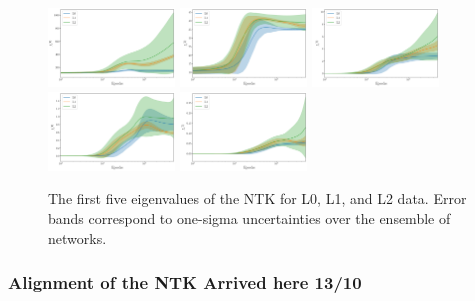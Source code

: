 \begin{figure}[t]
  \centering
  \includegraphics[width=0.30\textwidth]{figs/section_3/ntk_eigvals_L0_L1_L2_n_1.pdf}
  \includegraphics[width=0.30\textwidth]{figs/section_3/ntk_eigvals_L0_L1_L2_n_2.pdf}
  \includegraphics[width=0.30\textwidth]{figs/section_3/ntk_eigvals_L0_L1_L2_n_3.pdf}
  \includegraphics[width=0.30\textwidth]{figs/section_3/ntk_eigvals_L0_L1_L2_n_4.pdf}
  \includegraphics[width=0.30\textwidth]{figs/section_3/ntk_eigvals_L0_L1_L2_n_5.pdf}
  \caption{The first five eigenvalues of the NTK for L0, L1, and L2 data. Error
  bands correspond to one-sigma uncertainties over the ensemble of networks.}
  \label{fig:EigvalsComparison}
\end{figure}


\subsubsection{Alignment of the NTK \ac{Arrived here 13/10}}
\label{sec:NTKAlign}

